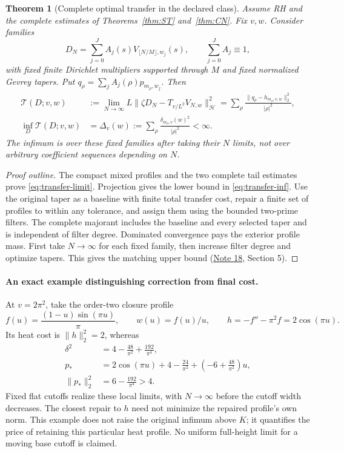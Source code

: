 \documentclass[11pt]{article}
\newtheorem{theorem}{Theorem}
\newcommand{\CTref}{\href{../notes/18_ARITHMETIC_HEAT_TRANSFER_AND_EXACT_COMPLETION_20261021.md}{Note 18}}
\begin{document}
\begin{theorem}[Complete optimal transfer in the declared class]
\label{thm:transfer}
Assume RH and the complete estimates of Theorems~\ref{thm:ST}
and~\ref{thm:CN}. Fix \(v,w\). Consider families
\[
 D_N=\sum_{j=0}^J A_j(s)V_{\lfloor N/M\rfloor,w_j}(s),\qquad
 \sum_{j=0}^J A_j\equiv1,
\]
with fixed finite Dirichlet multipliers supported through \(M\) and
fixed normalized Gevrey tapers. Put
\(q_\rho=\sum_jA_j(\rho)p_{m_\rho,w_j}\). Then
\begin{align}
 \mathcal T(D;v,w)&:=\lim_{N\to\infty}L
     \|\zeta D_N-T_{v/L^2}V_{N,w}\|_{\mathcal H}^2
       =\sum_\rho\frac{\|q_\rho-h_{m_\rho,v,w}\|_2^2}{|\rho|^2},
       \label{eq:transfer-limit}\\
 \inf_D\mathcal T(D;v,w)&=
       \Delta_v(w):=\sum_\rho\frac{\delta_{m_\rho,v}(w)^2}{|\rho|^2}
       <\infty.\label{eq:transfer-inf}
\end{align}
The infimum is over these fixed families after taking their \(N\)
limits, not over arbitrary coefficient sequences depending on \(N\).
\end{theorem}
\begin{proof}[Proof outline]
The compact mixed profiles and the two complete tail estimates prove
\eqref{eq:transfer-limit}. Projection gives the lower bound in
\eqref{eq:transfer-inf}. Use the original taper as a baseline with
finite total transfer cost, repair a finite set of profiles to within
any tolerance, and assign them using the bounded two-prime filters.
The complete majorant includes the baseline and every selected taper
and is independent of filter degree. Dominated convergence pays the
exterior profile mass. First take \(N\to\infty\) for each fixed
family, then increase filter degree and optimize tapers. This gives
the matching upper bound (\CTref, Section 5).
\end{proof}

\paragraph{An exact example distinguishing correction from final cost.}
At \(v=2\pi^2\), take the order-two closure profile
\[
 f(u)=\frac{(1-u)\sin(\pi u)}\pi,\qquad
 w(u)=f(u)/u,\qquad h=-f''-\pi^2f=2\cos(\pi u).
\]
Its heat cost is \(\|h\|_2^2=2\), whereas
\begin{align*}
 \delta^2&=4-\frac{48}{\pi^2}+\frac{192}{\pi^4},\\
 p_*&=2\cos(\pi u)+4-\frac{24}{\pi^2}
                   +\left(-6+\frac{48}{\pi^2}\right)u,\\
 \|p_*\|_2^2&=6-\frac{192}{\pi^4}>4.
\end{align*}
Fixed flat cutoffs realize these local limits, with \(N\to\infty\)
before the cutoff width decreases. The closest repair to \(h\) need
not minimize the repaired profile's own norm. This example does not
raise the original infimum above \(K\); it quantifies the price of
retaining this particular heat profile. No uniform full-height limit
for a moving base cutoff is claimed.
\end{document}
